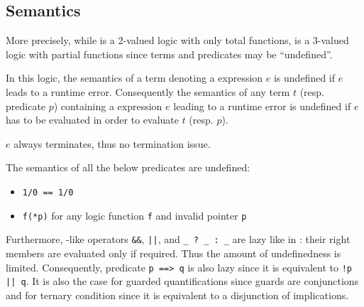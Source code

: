 
\subsection{Semantics}
\label{sec:semantics}


More precisely, while \acsl is a 2-valued logic with only total
functions, \eacsl is a 3-valued logic with partial functions since
terms and predicates may be ``undefined''.

In this logic, the semantics of a term denoting a \C expression $e$ is undefined
if $e$ leads to a runtime error. Consequently the semantics of any term $t$
(resp. predicate $p$) containing a \C expression $e$ leading to a runtime error
is undefined if $e$ has to be evaluated in order to evaluate $t$ (resp. $p$).
\begin{remark}[Julien]
$e$ always terminates, thus no termination issue.
\end{remark}
\begin{example}
The semantics of all the below predicates are undefined:
\begin{itemize}
\item \lstinline|1/0 == 1/0|
\item \lstinline|f(*p)| for any logic function \lstinline|f| and invalid pointer
  \lstinline|p|
\end{itemize}
\end{example}

Furthermore, \C-like operators \lstinline|&&|, \lstinline+||+, and
\lstinline|_ ? _ : _| are lazy like in \C: their right members are evaluated
only if required. Thus the amount of undefinedness is limited. Consequently,
predicate \lstinline|p ==> q| is also lazy since it is equivalent
to \lstinline+!p || q+. It is also the case for guarded quantifications since
guards are conjunctions and for ternary condition since it is equivalent to a
disjunction of implications.

